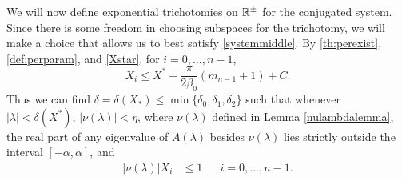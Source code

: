 \documentclass[10pt,reqno]{amsart}
\theoremstyle{plain}
\theoremstyle{definition}
\theoremstyle{remark}
\numberwithin{theorem}{section}
\numberwithin{equation}{section}
\begin{document}
We will now define exponential trichotomies on $\mathbb{R}^\pm$ for the conjugated system. Since there is some freedom in choosing subspaces for the trichotomy, we will make a choice that allows us to best satisfy \cref{systemmiddle}. By \cref{th:perexist}, \cref{def:perparam}, and \cref{Xstar}, for $i = 0, \dots, n-1$,
\[
X_i \leq X^* + \frac{\pi}{2 \beta_0}(m_{n-1} + 1) + C.
\]
Thus we can find $\delta = \delta(X_*) \leq \min\{ \delta_0, \delta_1, \delta_2 \}$ such that whenever $|\lambda| < \delta(X^*)$, $|\nu(\lambda)| < \eta$, where $\nu(\lambda)$ defined in Lemma \ref{nulambdalemma}, the real part of any eigenvalue of $A(\lambda)$ besides $\nu(\lambda)$ lies strictly outside the interval $[-\alpha, \alpha]$, and
\begin{align}\label{nubound}
|\nu(\lambda)|X_i &\leq 1 && i = 0, \dots, n-1.
\end{align}
\end{document}
